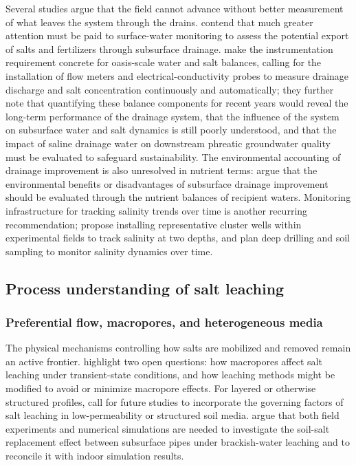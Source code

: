 \documentclass[11pt]{article}
\begin{document}
Several studies argue that the field cannot advance without better measurement of what leaves the system through the drains. \textcite{Mastrocicco2013} contend that much greater attention must be paid to surface-water monitoring to assess the potential export of salts and fertilizers through subsurface drainage. \textcite{Askri2022} make the instrumentation requirement concrete for oasis-scale water and salt balances, calling for the installation of flow meters and electrical-conductivity probes to measure drainage discharge and salt concentration continuously and automatically; they further note that quantifying these balance components for recent years would reveal the long-term performance of the drainage system, that the influence of the system on subsurface water and salt dynamics is still poorly understood, and that the impact of saline drainage water on downstream phreatic groundwater quality must be evaluated to safeguard sustainability. The environmental accounting of drainage improvement is also unresolved in nutrient terms: \textcite{Turtola1995} argue that the environmental benefits or disadvantages of subsurface drainage improvement should be evaluated through the nutrient balances of recipient waters. Monitoring infrastructure for tracking salinity trends over time is another recurring recommendation; \textcite{Singh2020d} propose installing representative cluster wells within experimental fields to track salinity at two depths, and \textcite{Gafni2001} plan deep drilling and soil sampling to monitor salinity dynamics over time.

\subsection{Process understanding of salt leaching}

\subsubsection{Preferential flow, macropores, and heterogeneous media}

The physical mechanisms controlling how salts are mobilized and removed remain an active frontier. \textcite{Xin2016} highlight two open questions: how macropores affect salt leaching under transient-state conditions, and how leaching methods might be modified to avoid or minimize macropore effects. For layered or otherwise structured profiles, \textcite{Zhang2022} call for future studies to incorporate the governing factors of salt leaching in low-permeability or structured soil media. \textcite{Li2023} argue that both field experiments and numerical simulations are needed to investigate the soil-salt replacement effect between subsurface pipes under brackish-water leaching and to reconcile it with indoor simulation results.
\end{document}
